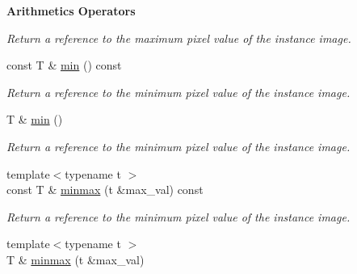 \begin{Indent}{\bf Arithmetics Operators}
\begin{DoxyCompactItemize}
\begin{DoxyCompactList}\small\item\em Return a reference to the maximum pixel value of the instance image. \end{DoxyCompactList}\item 
\hypertarget{structcimg__library_1_1_c_img_list_a3c8465a865679f4838390767a4e80f00}{const T \& \hyperlink{structcimg__library_1_1_c_img_list_a3c8465a865679f4838390767a4e80f00}{min} () const }\label{structcimg__library_1_1_c_img_list_a3c8465a865679f4838390767a4e80f00}

\begin{DoxyCompactList}\small\item\em Return a reference to the minimum pixel value of the instance image. \end{DoxyCompactList}\item 
\hypertarget{structcimg__library_1_1_c_img_list_a3894410e0f9c928fae78e3998c607fe5}{T \& \hyperlink{structcimg__library_1_1_c_img_list_a3894410e0f9c928fae78e3998c607fe5}{min} ()}\label{structcimg__library_1_1_c_img_list_a3894410e0f9c928fae78e3998c607fe5}

\begin{DoxyCompactList}\small\item\em Return a reference to the minimum pixel value of the instance image. \end{DoxyCompactList}\item 
\hypertarget{structcimg__library_1_1_c_img_list_a095c38fc989e7f09d74145a467644811}{{\footnotesize template$<$typename t $>$ }\\const T \& \hyperlink{structcimg__library_1_1_c_img_list_a095c38fc989e7f09d74145a467644811}{minmax} (t \&max\-\_\-val) const }\label{structcimg__library_1_1_c_img_list_a095c38fc989e7f09d74145a467644811}

\begin{DoxyCompactList}\small\item\em Return a reference to the minimum pixel value of the instance image. \end{DoxyCompactList}\item 
\hypertarget{structcimg__library_1_1_c_img_list_aeb3a9d2caa2f7475b243da4d9fbadef9}{{\footnotesize template$<$typename t $>$ }\\T \& \hyperlink{structcimg__library_1_1_c_img_list_aeb3a9d2caa2f7475b243da4d9fbadef9}{minmax} (t \&max\-\_\-val)}\label{structcimg__library_1_1_c_img_list_aeb3a9d2caa2f7475b243da4d9fbadef9}


\end{DoxyCompactItemize}
\end{Indent}
